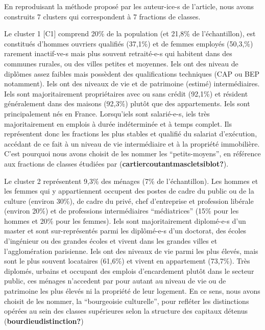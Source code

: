 \documentclass[
  12pt,
]{book}
\begin{document}
En reproduisant la méthode proposé par les auteur-ice-s de l'article,
nous avons construits 7 clusters qui correspondent à 7 fractions de
classes.

Le cluster 1 {[}C1{]} comprend 20\% de la population (et 21,8\% de
l'échantillon), est constitués d'hommes ouvriers qualifiés (37,1\%) et
de femmes employés (50,3,\%) rarement inactif-ve-s mais plus souvent
retraité-e-s qui habitent dans des communes rurales, ou des villes
petites et moyennes. Iels ont des niveau de diplômes assez faibles mais
possèdent des qualifications techniques (CAP ou BEP notamment). Iels ont
des niveaux de vie et de patrimoine (estimé) intermédiaires. Iels sont
majoritairement propriétaires avec ou sans crédit (92,1\%) et résident
généralement dans des maisons (92,3\%) plutôt que des appartements. Iels
sont principalement nés en France. Lorsqu'iels sont salarié-e-s, iels
très majoritairement en emplois à durée indéterminée et à temps complet.
Ils représentent donc les fractions les plus stables et qualifié du
salariat d'exécution, accédant de ce fait à un niveau de vie
intermédiaire et à la propriété immobilière. C'est pourquoi nous avons
choisit de les nommer les ``petits-moyens'', en référence aux fractions
de classes étudiées par (\textbf{cartiercoutantmascletsiblot?}).

Le cluster 2 représentent 9,3\% des ménages (7\% de l'échantillon). Les
hommes et les femmes qui y appartiennent occupent des postes de cadre du
public ou de la culture (environ 30\%), de cadre du privé, chef
d'entreprise et profession libérale (environ 20\%) et de professions
intermédiaires ``médiatrices'' (15\% pour les hommes et 20\% pour les
femmes). Iels sont majoritairement diplomé-e-s d'un master et sont
sur-représentés parmi les diplômé-e-s d'un doctorat, des écoles
d'ingénieur ou des grandes écoles et vivent dans les grandes villes et
l'agglomération parisienne. Iels ont des niveaux de vie parmi les plus
élevés, mais sont le plus souvent locataires (61,6\%) et vivent en
appartement (73,7\%). Très diplomés, urbains et occupant des emplois
d'encardement plutôt dans le secteur public, ces ménages n'accedent par
pour autant au niveau de vie ou de patrimoine les plus élevés ni la
propriété de leur logement. En ce sens, nous avons choisit de les
nommer, la ``bourgeoisie culturelle'', pour refléter les distinctions
opérées au sein des classes supérieures selon la structure des capitaux
détenus (\textbf{bourdieudistinction?})
\end{document}
